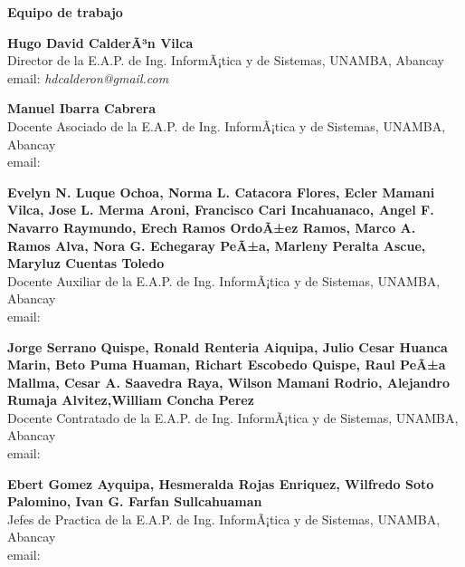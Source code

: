 \begin{center}
{\bf \Huge Equipo de trabajo}
\end{center}
\vspace{1cm}

\begin{center}
\textbf{Hugo David CalderÃ³n Vilca}\\
Director de la E.A.P. de Ing. InformÃ¡tica y de Sistemas, UNAMBA, Abancay\\
email: \textit{hdcalderon@gmail.com}\\
\end{center}

\begin{center}
\textbf{Manuel Ibarra Cabrera}\\
Docente Asociado de la E.A.P. de Ing. InformÃ¡tica y de Sistemas, UNAMBA, Abancay\\
email: \textit{ }\\
\end{center}

\begin{center}
\textbf{ Evelyn N. Luque Ochoa, Norma L. Catacora Flores, Ecler Mamani Vilca, Jose L. Merma Aroni, Francisco Cari Incahuanaco, Angel F. Navarro Raymundo, Erech Ramos OrdoÃ±ez Ramos, Marco A. Ramos Alva, Nora G. Echegaray PeÃ±a, Marleny Peralta Ascue, Maryluz Cuentas Toledo}\\
Docente Auxiliar de la E.A.P. de Ing. InformÃ¡tica y de Sistemas, UNAMBA, Abancay\\
email: \textit{ }\\
\end{center}

\begin{center}
\textbf{Jorge Serrano Quispe, Ronald Renteria Aiquipa, Julio Cesar Huanca Marin, Beto Puma Huaman, Richart Escobedo Quispe, Raul PeÃ±a Mallma, Cesar A. Saavedra Raya, Wilson Mamani Rodrio, Alejandro Rumaja Alvitez,William Concha Perez}\\
Docente Contratado de la E.A.P. de Ing. InformÃ¡tica y de Sistemas, UNAMBA, Abancay\\
email: \textit{ }\\
\end{center}


\begin{center}
\textbf{Ebert Gomez Ayquipa, Hesmeralda Rojas Enriquez, Wilfredo Soto Palomino, Ivan G. Farfan Sullcahuaman }\\
Jefes de Practica de la E.A.P. de Ing. InformÃ¡tica y de Sistemas, UNAMBA, Abancay\\
email: \textit{ }\\
\end{center}


